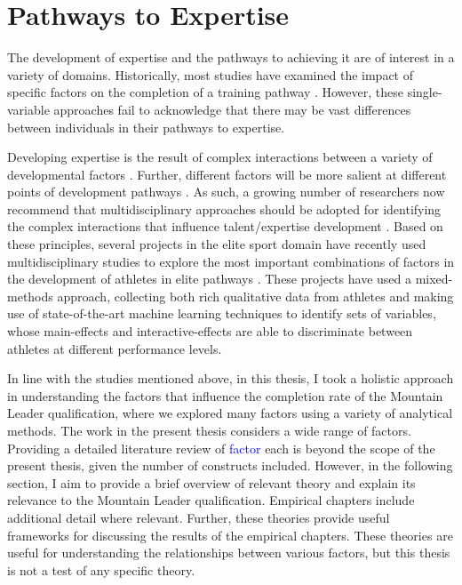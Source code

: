 \documentclass[
  12pt,
  a4paper,
]{book}
\begin{document}
\hypertarget{pathways-to-expertise}{%
\section{Pathways to Expertise}\label{pathways-to-expertise}}

The development of expertise and the pathways to achieving it are of interest in a variety of domains. Historically, most studies have examined the impact of specific factors on the completion of a training pathway \citep[e.g., delays in completing PhDs;][]{VandeSchoot2013a}. However, these single-variable approaches fail to acknowledge that there may be vast differences between individuals in their pathways to expertise.

Developing expertise is the result of complex interactions between a variety of developmental factors \citep[e.g., practice and training, personality traits, motivation, social support to name but a few;][]{Baker2013, Gagne2004, Johnston2018}. Further, different factors will be more salient at different points of development pathways \citep{Rees2016}. As such, a growing number of researchers now recommend that multidisciplinary approaches should be adopted for identifying the complex interactions that influence talent/expertise development \citep[e.g.,][]{Abernethy2013, Gullich2019, Johnston2018, Pearson2006, Rees2016, Schorer2013}. Based on these principles, several projects in the elite sport domain have recently used multidisciplinary studies to explore the most important combinations of factors in the development of athletes in elite pathways \citep[e.g.,][]{Gullich2019, Hardy2017, Jones2019a, Jones2019b, Jones2020, Rees2016}. These projects have used a mixed-methods approach, collecting both rich qualitative data from athletes and making use of state-of-the-art machine learning techniques to identify sets of variables, whose main-effects and interactive-effects are able to discriminate between athletes at different performance levels.

In line with the studies mentioned above, in this thesis, I took a holistic approach in understanding the factors that influence the completion rate of the Mountain Leader qualification, where we explored many factors using a variety of analytical methods. The work in the present thesis considers a wide range of factors. Providing a detailed literature review of \textcolor{blue}{factor} each is beyond the scope of the present thesis, given the number of constructs included. However, in the following section, I aim to provide a brief overview of relevant theory and explain its relevance to the Mountain Leader qualification. Empirical chapters include additional detail where relevant. Further, these theories provide useful frameworks for discussing the results of the empirical chapters. These theories are useful for understanding the relationships between various factors, but this thesis is not a test of any specific theory.
\end{document}
